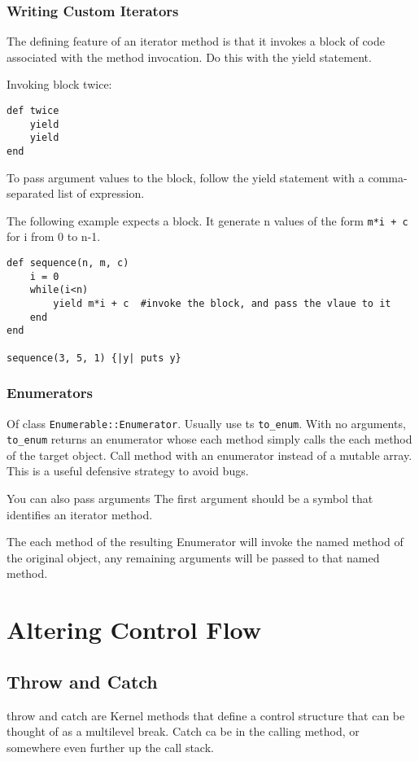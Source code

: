 \documentclass[11pt, a4paper]{book}
\begin{document}
\subsection{Writing Custom Iterators}
The defining feature of an iterator method is that it invokes a block of code
associated with the method invocation. Do this with the yield statement.

Invoking block twice:
\begin{verbatim}
def twice
    yield
    yield
end
\end{verbatim}
To pass argument values to the block, follow the yield statement with a
comma-separated list of expression.

The following example expects a block. It generate n values of the form
\verb|m*i + c| for i from 0 to n-1.
\begin{verbatim}
def sequence(n, m, c)
    i = 0
    while(i<n)
        yield m*i + c  #invoke the block, and pass the vlaue to it
    end
end

sequence(3, 5, 1) {|y| puts y}
\end{verbatim}
\subsection{Enumerators}
Of class \verb|Enumerable::Enumerator|. Usually use ts \verb|to_enum|. With no
arguments, \verb|to_enum| returns an enumerator whose each method simply calls
the each method of the target object. Call method with an enumerator instead of
a mutable array. This is a useful defensive strategy to avoid bugs.

You can also pass arguments The first argument should be a symbol that
identifies an iterator method.

The each method of the resulting Enumerator will invoke the named method of the
original object, any remaining arguments will be passed to that named method. 

\chapter{Altering Control Flow}
\section{Throw and Catch}
throw and catch are Kernel methods that define a control structure that can be
thought of as a multilevel break. Catch ca be in the calling method, or
somewhere even further up the call stack.
\end{document}

